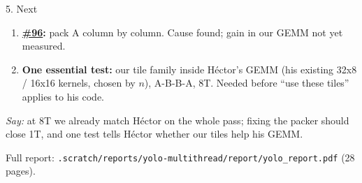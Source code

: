 \documentclass[aspectratio=169,11pt]{beamer}
\newcommand{\iss}[1]{\href{https://github.com/JieGH/RVV_code_gen_via_MLIR_xDSL/issues/#1}{\##1}}
\newcommand{\src}[1]{\par\vfill{\tiny\color{muted}#1\par}}
\newcommand{\say}[1]{{\small\color{muted}\emph{Say:} #1}}
\begin{document}
\begin{frame}{5. Next}
\begin{enumerate}
\item \textbf{\iss{96}:} pack A column by column. Cause found; gain in our GEMM not yet measured.
\item \textbf{One essential test:} our tile family inside H\'ector's GEMM (his existing 32x8 / 16x16 kernels, chosen by $n$), A-B-B-A, 8T. Needed before ``use these tiles'' applies to his code.
\end{enumerate}
\vspace{8pt}
\say{at 8T we already match H\'ector on the whole pass; fixing the packer should close 1T, and one test tells H\'ector whether our tiles help his GEMM.}
\src{Full report: \texttt{.scratch/reports/yolo-multithread/report/yolo\_report.pdf} (28 pages).}
\end{frame}
\end{document}
